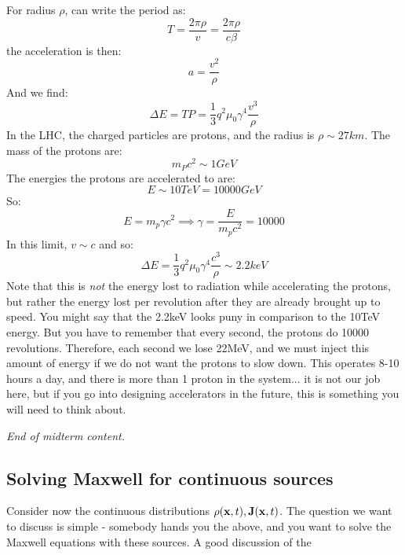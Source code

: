 \begin{itemize}
    For radius $\rho$, can write the period as:
    \begin{equation}
        T = \frac{2\pi \rho}{v} = \frac{2\pi \rho}{c\beta}
    \end{equation}
    the acceleration is then:
    \begin{equation}
        a = \frac{v^2}{\rho}
    \end{equation}
    And we find:
    \begin{equation}
        \Delta E = TP = \frac{1}{3}q^2\mu_0 \gamma^4\frac{v^3}{\rho}
    \end{equation}
    In the LHC, the charged particles are protons, and the radius is $\rho \sim 27\si{km}$. The mass of the protons are:
    \begin{equation}
        m_P c^2 \sim 1\si{GeV}
    \end{equation}
    The energies the protons are accelerated to are:
    \begin{equation}
        E \sim 10\si{TeV} = 10000\si{GeV}
    \end{equation}
    So:
    \begin{equation}
        E = m_p \gamma c^2 \implies \gamma = \frac{E}{m_p c^2} = 10000
    \end{equation}
    In this limit, $v \sim c$ and so:
    \begin{equation}
        \Delta E = \frac{1}{3}q^2\mu_0 \gamma^4\frac{c^3}{\rho} \sim 2.2\si{keV}
    \end{equation}
    Note that this is \emph{not} the energy lost to radiation while accelerating the protons, but rather the energy lost per revolution after they are already brought up to speed. You might say that the 2.2keV looks puny in comparison to the 10TeV energy. But you have to remember that every second, the protons do 10000 revolutions. Therefore, each second we lose 22MeV, and we must inject this amount of energy if we do not want the protons to slow down. This operates 8-10 hours a day, and there is more than 1 proton in the system... it is not our job here, but if you go into designing accelerators in the future, this is something you will need to think about.
    \end{itemize}

\begin{center}
    \emph{End of midterm content.}
\end{center}

\subsection{Solving Maxwell for continuous sources}
Consider now the continuous distributions $\rho(\mathbf{x}, t), \mathbf{J}(\mathbf{x}, t)$. The question we want to discuss is simple - somebody hands you the above, and you want to solve the Maxwell equations with these sources. A good discussion of the 

